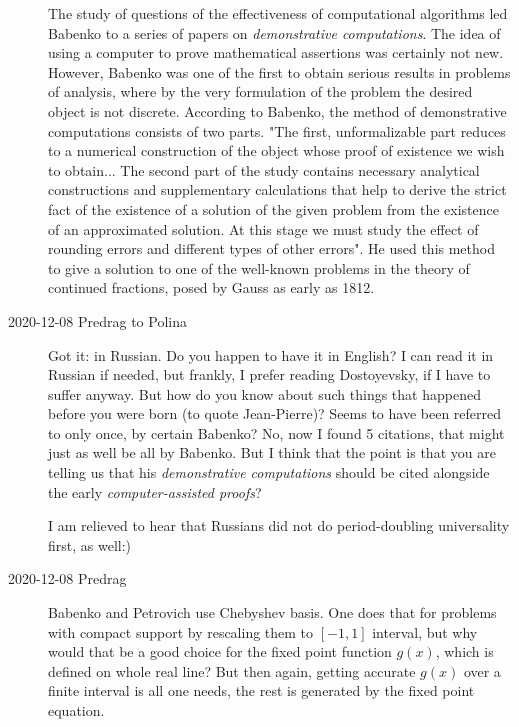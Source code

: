 \begin{description}
The  study  of  questions  of  the  effectiveness   of  computational
algorithms led  Babenko  to  a  series  of  papers  on  \emph{demonstrative
computations}.   The idea  of  using  a  computer  to  prove
mathematical  assertions  was  certainly  not new.    However,  Babenko
was  one  of  the  first  to  obtain  serious  results  in problems  of
analysis,  where  by  the  very  formulation  of  the  problem
the desired  object  is  not  discrete. According  to  Babenko,   the
method  of  demonstrative  computations consists  of  two  parts.   "The
first,  unformalizable  part  reduces  to  a  numerical construction  of
the  object  whose  proof  of  existence  we  wish  to  obtain... The
second  part  of  the  study  contains  necessary  analytical
constructions  and supplementary  calculations  that  help  to  derive
the  strict  fact  of  the  existence of  a  solution  of  the  given
problem  from  the  existence  of  an  approximated solution.    At  this
stage  we  must  study  the  effect   of  rounding  errors  and different
types  of  other  errors". He  used
this  method  to  give  a  solution  to one  of  the  well-known  problems
in  the  theory  of  continued  fractions,  posed by  Gauss  as  early  as
1812.

\item[2020-12-08 Predrag to Polina]
Got it:
{in Russian}.
Do you happen to have it in English? I can read it in Russian if needed,
but frankly, I prefer reading Dostoyevsky, if I have to suffer anyway.
But how do you know about such things that happened before you were born
(to quote Jean-Pierre)? Seems to have been referred to only once, by
certain Babenko? No, now I found 5 citations, that might just as well be
all by Babenko. But I think that the point is that you are telling us
that his \emph{demonstrative computations} should be cited alongside the early
\emph{computer-assisted proofs}?

I am relieved to hear that Russians did not do period-doubling
universality first, as well:)

\item[2020-12-08 Predrag]
Babenko and Petrovich use Chebyshev basis. One does that for
problems with compact support by rescaling them to $[-1,1]$ interval, but
why would that be a good choice for the fixed point function $g(x)$,
which is defined on whole real line? But then again, getting accurate
$g(x)$ over a finite interval is all one needs, the rest is generated by
the fixed point equation.


\end{description}

